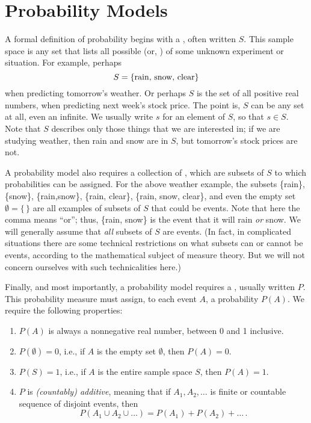 \section{Probability Models}
A formal definition of probability begins with a , often written  $S$. This
sample space is any set that lists all possible  (or, )
of some unknown experiment or situation. For example, perhaps
\begin{equation}
    S =  \text{\{rain, snow, clear\}} \notag
\end{equation}
when predicting tomorrow's weather. Or perhaps $S$ is the set of all positive real numbers, when predicting next
week's stock price. The point is, $S$ can be any set at all, even an infinite. We usually write $s$ for an element of
$S$, so that $s \in S$. Note that $S$ describes only those things that we are interested in; if we are studying
weather, then rain and snow are in $S$, but tomorrow's stock prices are not.

A probability model also requires a collection of , which are subsets of $S$ to which
probabilities can be assigned. For the above weather example, the subsets \{rain\}, \{snow\}, \{rain,snow\}, \{rain,
clear\}, \{rain, snow, clear\}, and even the empty set $\emptyset = \{\,\}$ are all examples of subsets of $S$ that
could be events. Note that here the comma means ``or''; thus, \{rain, snow\} is the event that it will rain \emph{or}
snow. We will generally assume that \emph{all} subsets of $S$ are events. (In fact, in complicated situations there
are some technical restrictions on what subsets can or cannot be events, according to the mathematical subject of
measure theory. But we will not concern ourselves with such technicalities here.)

Finally, and most importantly, a probability model requires a ,
usually written $P$. This probability measure must assign, to each event $A$, a probability $P(A)$. We require the
following properties:
\begin{enumerate}
    \item $P(A)$ is always a nonnegative real number, between 0 and 1 inclusive.
    \item $P(\emptyset) = 0$, i.e., if $A$ is the empty set $\emptyset$, then $P(A)=0$.
    \item $P(S)=1$, i.e., if $A$ is the entire sample space $S$, then $P(A)=1$.
    \item $P$ is \emph{(countably) additive}, meaning that if $A_1, A_2, \dots$ is finite or countable sequence of
    disjoint events, then
    \begin{equation}\label{eq:additive_rule}
        P(A_1 \cup A_2 \cup \ldots) = P(A_1) + P(A_2) + \ldots\,.
    \end{equation}
\end{enumerate}

